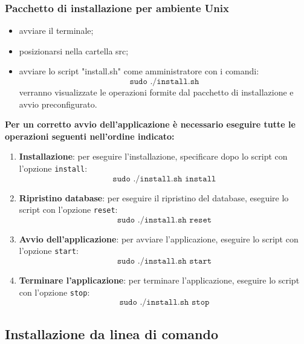 \documentclass[12pt,a4paper]{article}
\begin{document}
		\subsubsection{Pacchetto di installazione per ambiente Unix}
		\begin{itemize}
			\item avviare il terminale;
			\item posizionarsi nella cartella src;
			\item avviare lo script "install.sh" come amministratore con i comandi:
		\[ 	\texttt{sudo  ./install.sh} \]
		verranno visualizzate le operazioni formite dal pacchetto di installazione e avvio preconfigurato.
	\end{itemize}
		\textbf{Per un corretto avvio dell'applicazione è necessario eseguire tutte le operazioni seguenti nell'ordine indicato:}
	\begin{enumerate}
		\item \textbf{Installazione}: per eseguire l'installazione, specificare dopo lo script con l'opzione \texttt{install}:
	 \[ 	\texttt{sudo  ./install.sh install} \]
		\item \textbf{Ripristino database}: per eseguire il ripristino del database, eseguire lo script con l'opzione \texttt{reset}:
		 \[ 	\texttt{sudo  ./install.sh reset} \]
		\item \textbf{Avvio dell'applicazione}: per avviare l'applicazione, eseguire lo script con l'opzione \texttt{start}:
		 \[ 	\texttt{sudo  ./install.sh start} \]
		\item \textbf{Terminare l'applicazione}: per terminare l'applicazione, eseguire lo script con l'opzione \texttt{stop}:
			 \[ 	\texttt{sudo  ./install.sh stop} \]
	
			

		\end{enumerate}
	\subsection{Installazione da linea di comando}
\end{document}
